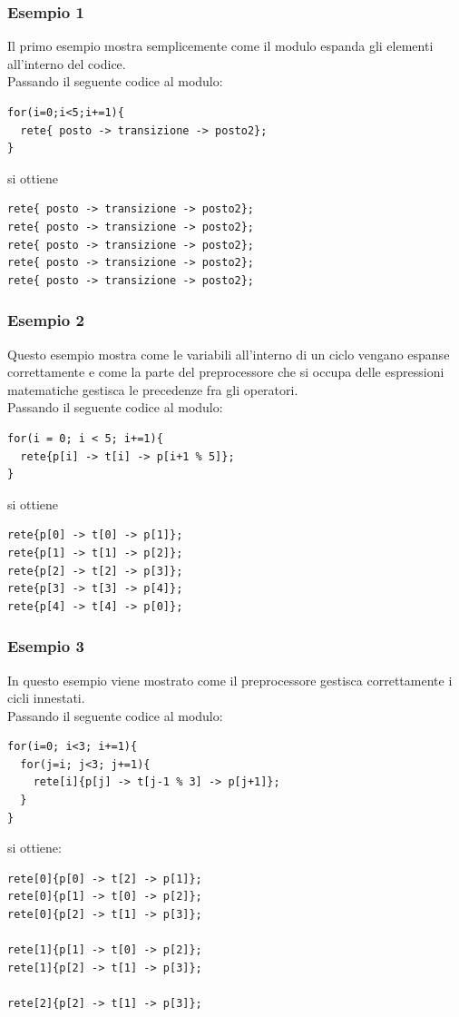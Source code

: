 \documentclass[italian,12pt]{book}
\begin{document}
\subsubsection{Esempio 1}
Il primo esempio mostra semplicemente come il modulo espanda gli
elementi all'interno del codice. \\
Passando il seguente codice al modulo:
\begin{verbatim}
for(i=0;i<5;i+=1){
  rete{ posto -> transizione -> posto2};
}
\end{verbatim}
si ottiene
\begin{verbatim}
rete{ posto -> transizione -> posto2};
rete{ posto -> transizione -> posto2};
rete{ posto -> transizione -> posto2};
rete{ posto -> transizione -> posto2};
rete{ posto -> transizione -> posto2};
\end{verbatim}

\subsubsection{Esempio 2}
Questo esempio mostra come le variabili all'interno di un ciclo
vengano espanse correttamente e come la parte del preprocessore che si
occupa delle espressioni matematiche gestisca le precedenze fra gli
operatori.\\
Passando il seguente codice al modulo:
\begin{verbatim}
for(i = 0; i < 5; i+=1){
  rete{p[i] -> t[i] -> p[i+1 % 5]};
}
\end{verbatim}
si ottiene
\begin{verbatim}
rete{p[0] -> t[0] -> p[1]};
rete{p[1] -> t[1] -> p[2]};
rete{p[2] -> t[2] -> p[3]};
rete{p[3] -> t[3] -> p[4]};
rete{p[4] -> t[4] -> p[0]};
\end{verbatim}

\subsubsection{Esempio 3}
In questo esempio viene mostrato come il preprocessore gestisca
correttamente i cicli innestati. \\
Passando il seguente codice al modulo:
\begin{verbatim}
for(i=0; i<3; i+=1){
  for(j=i; j<3; j+=1){
    rete[i]{p[j] -> t[j-1 % 3] -> p[j+1]};
  }
}
\end{verbatim}
si ottiene:
\begin{verbatim}
rete[0]{p[0] -> t[2] -> p[1]};
rete[0]{p[1] -> t[0] -> p[2]};
rete[0]{p[2] -> t[1] -> p[3]};
    
rete[1]{p[1] -> t[0] -> p[2]};
rete[1]{p[2] -> t[1] -> p[3]};
    
rete[2]{p[2] -> t[1] -> p[3]};
\end{verbatim}
\end{document}
